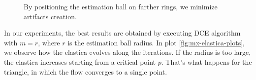 \documentclass[runningheads]{llncs}
\begin{document}
\begin{figure}[!ht]
\begin{minipage}[b]{0.33\textwidth}
{	}%
\end{minipage}%
\begin{minipage}[b]{0.33\textwidth}
\end{minipage}%
\label{fig:mx-square-flow}
\caption{By positioning the estimation ball on farther rings, we minimize artifacts creation. }
\end{figure}

In our experiments, the best results are obtained by executing DCE algorithm with $m=r$, where $r$ is the estimation ball radius. In plot \ref{fig:mx-elastica-plots}, we observe how the elastica evolves along the iterations. If the radius is too large, the elastica increases starting from a critical point $p$. That's what happens for the triangle, in which the flow converges to a single point.
\end{document}
